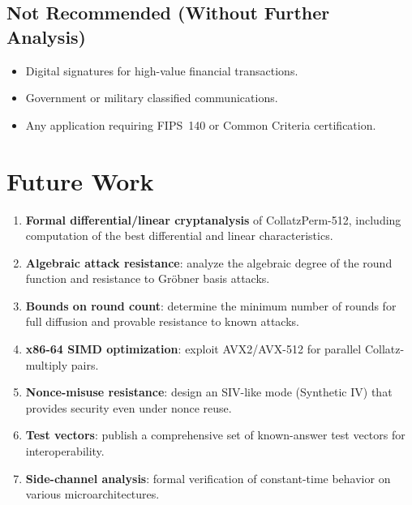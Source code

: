 \documentclass[11pt,a4paper]{article}
\begin{document}
\subsection{Not Recommended (Without Further Analysis)}

\begin{itemize}
    \item Digital signatures for high-value financial transactions.
    \item Government or military classified communications.
    \item Any application requiring FIPS~140 or Common Criteria
          certification.
\end{itemize}

\section{Future Work}
\label{sec:future}

\begin{enumerate}
    \item \textbf{Formal differential/linear cryptanalysis} of
          CollatzPerm-512, including computation of the best differential
          and linear characteristics.
    \item \textbf{Algebraic attack resistance}: analyze the algebraic
          degree of the round function and resistance to Gr\"obner basis
          attacks.
    \item \textbf{Bounds on round count}: determine the minimum number
          of rounds for full diffusion and provable resistance to known
          attacks.
    \item \textbf{x86-64 SIMD optimization}: exploit AVX2/AVX-512 for
          parallel Collatz-multiply pairs.
    \item \textbf{Nonce-misuse resistance}: design an SIV-like mode
          (Synthetic IV) that provides security even under nonce reuse.
    \item \textbf{Test vectors}: publish a comprehensive set of
          known-answer test vectors for interoperability.
    \item \textbf{Side-channel analysis}: formal verification of
          constant-time behavior on various microarchitectures.
\end{enumerate}

\end{document}
